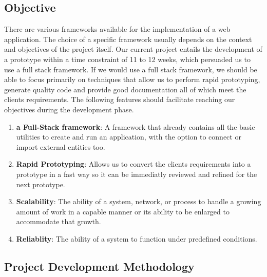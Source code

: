 \subsection{Objective}
There are various frameworks available for the implementation of a web application. The choice of a specific framework usually depends on the context and objectives of the project itself. Our current project entails the development of a prototype within a time constraint of 11 to 12 weeks, which persuaded us to use a full stack framework. If we would use a full stack framework, we should be able to focus primarily on techniques that allow us to perform rapid prototyping, generate quality code and provide good documentation all of which meet the clients requirements. The following features should facilitate reaching our objectives during the development phase.

\begin{enumerate}
	\item \textbf{a Full-Stack framework}: A framework that already contains all the basic utilities to create and run an application, with the option to connect or import external entities too.
	\item \textbf{Rapid Prototyping}: Allows us to convert the clients requirements into a prototype in a fast way so it can be immediatly reviewed and refined for the next prototype.
	\item \textbf{Scalability}: The ability of a system, network, or process to handle a growing amount of work in a capable manner or its ability to be enlarged to accommodate that growth.\cite{wiki:scalability}
	\item \textbf{Reliablity}: The ability of a system to function under predefined conditions.
\end{enumerate}
\subsection{Project Development Methodology} %

